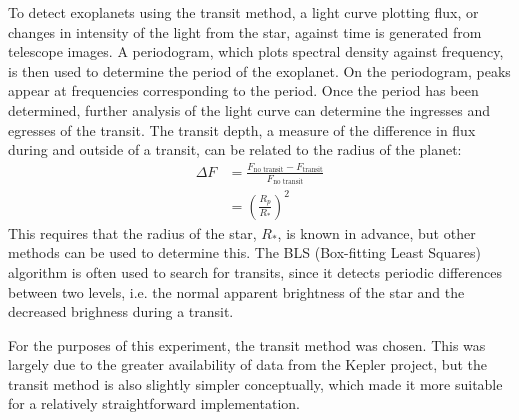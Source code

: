 To detect exoplanets using the transit method, a light curve plotting flux, or changes in intensity of the
light from the star, against time is generated from telescope images. A periodogram, which plots spectral density against frequency,
is then used to determine the period of the exoplanet. On the periodogram, peaks appear at frequencies corresponding
to the period. Once the period has been determined, further analysis of the light curve can determine the ingresses
and egresses of the transit. The transit depth, a measure of the difference in flux during and outside of a transit,
can be related to the radius of the planet:
\begin{align*}
	\Delta F &= \frac{ F_{\text{no transit}} - F_{\text{transit}} }{ F_{\text{no transit}} } \\
	&= (\frac{R_p}{R_*})^2
\end{align*}
This requires that the radius of the star, \(R_*\), is known in advance, but other methods can be used to determine this.
The BLS (Box-fitting Least Squares) algorithm is often used to search for transits, since it detects periodic differences
between two levels, i.e. the normal apparent brightness of the star and the decreased brighness during a transit.\autocite{bls}

For the purposes of this experiment, the transit method was chosen. This was largely due to the greater availability of data from the Kepler project,
but the transit method is also slightly simpler conceptually, which made it more suitable for a relatively straightforward implementation.
